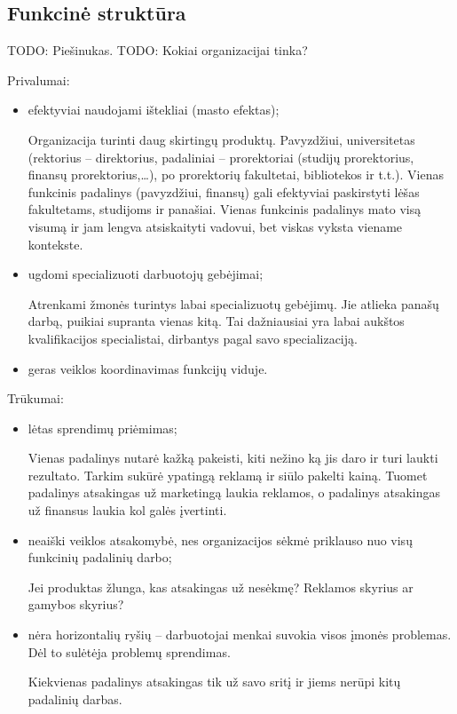 \subsection{Funkcinė struktūra}

TODO: Piešinukas.
TODO: Kokiai organizacijai tinka?

Privalumai:
\begin{itemize}
  \item efektyviai naudojami ištekliai (masto efektas);
    \begin{note}
      Organizacija turinti daug skirtingų produktų. Pavyzdžiui,
      universitetas (rektorius – direktorius, padaliniai – prorektoriai
      (studijų prorektorius, finansų prorektorius,…), po prorektorių
      fakultetai, bibliotekos ir t.t.). Vienas funkcinis padalinys
      (pavyzdžiui, finansų) gali efektyviai paskirstyti lėšas fakultetams,
      studijoms ir panašiai. Vienas funkcinis padalinys mato visą
      visumą ir jam lengva atsiskaityti vadovui, bet viskas vyksta
      viename kontekste.
    \end{note}
  \item ugdomi specializuoti darbuotojų gebėjimai;
    \begin{note}
      Atrenkami žmonės turintys labai specializuotų gebėjimų. Jie
      atlieka panašų darbą, puikiai supranta vienas kitą. Tai
      dažniausiai yra labai aukštos kvalifikacijos specialistai,
      dirbantys pagal savo specializaciją.
    \end{note}
  \item geras veiklos koordinavimas funkcijų viduje.
\end{itemize}

Trūkumai:
\begin{itemize}
  \item lėtas sprendimų priėmimas;
    \begin{exmp}
      Vienas padalinys nutarė kažką pakeisti, kiti nežino ką jis daro
      ir turi laukti rezultato. Tarkim sukūrė ypatingą reklamą ir siūlo
      pakelti kainą. Tuomet padalinys atsakingas už marketingą laukia
      reklamos, o padalinys atsakingas už finansus laukia kol galės
      įvertinti.
    \end{exmp}
  \item neaiški veiklos atsakomybė, nes organizacijos sėkmė priklauso
    nuo visų funkcinių padalinių darbo;
    \begin{exmp}
      Jei produktas žlunga, kas atsakingas už nesėkmę? Reklamos skyrius
      ar gamybos skyrius?
    \end{exmp}
  \item nėra horizontalių ryšių – darbuotojai menkai suvokia visos
    įmonės problemas. Dėl to sulėtėja problemų sprendimas.
    \begin{note}
      Kiekvienas padalinys atsakingas tik už savo sritį ir jiems
      nerūpi kitų padalinių darbas.
    \end{note}
\end{itemize}


